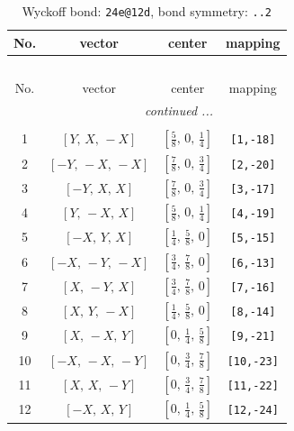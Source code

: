 \documentclass[fleqn,8pt]{jsarticle}
\begin{document}
\renewcommand{\arraystretch}{1.2}
\begin{longtable}{cccc}
\caption{Wyckoff bond: {\tt 24e@12d}, bond symmetry: {\tt ..2}}
 \\
 \hline \hline
No. & vector & center & mapping \\ \hline \endfirsthead

\multicolumn{3}{l}{\tablename\ \thetable{}} \\
 \hline \hline
No. & vector & center & mapping \\ \hline \endhead

 \hline \hline
\multicolumn{3}{r}{\footnotesize\it continued ...} \\ \endfoot

 \hline \hline
\multicolumn{3}{r}{} \\ \endlastfoot

1 & $\left[ Y,\, X,\, - X \right]$ & $\left[ \frac{5}{8},\, 0,\, \frac{1}{4} \right]$ & {\tt [1,-18]} \\ \hline
2 & $\left[ - Y,\, - X,\, - X \right]$ & $\left[ \frac{7}{8},\, 0,\, \frac{3}{4} \right]$ & {\tt [2,-20]} \\ \hline
3 & $\left[ - Y,\, X,\, X \right]$ & $\left[ \frac{7}{8},\, 0,\, \frac{3}{4} \right]$ & {\tt [3,-17]} \\ \hline
4 & $\left[ Y,\, - X,\, X \right]$ & $\left[ \frac{5}{8},\, 0,\, \frac{1}{4} \right]$ & {\tt [4,-19]} \\ \hline
5 & $\left[ - X,\, Y,\, X \right]$ & $\left[ \frac{1}{4},\, \frac{5}{8},\, 0 \right]$ & {\tt [5,-15]} \\ \hline
6 & $\left[ - X,\, - Y,\, - X \right]$ & $\left[ \frac{3}{4},\, \frac{7}{8},\, 0 \right]$ & {\tt [6,-13]} \\ \hline
7 & $\left[ X,\, - Y,\, X \right]$ & $\left[ \frac{3}{4},\, \frac{7}{8},\, 0 \right]$ & {\tt [7,-16]} \\ \hline
8 & $\left[ X,\, Y,\, - X \right]$ & $\left[ \frac{1}{4},\, \frac{5}{8},\, 0 \right]$ & {\tt [8,-14]} \\ \hline
9 & $\left[ X,\, - X,\, Y \right]$ & $\left[ 0,\, \frac{1}{4},\, \frac{5}{8} \right]$ & {\tt [9,-21]} \\ \hline
10 & $\left[ - X,\, - X,\, - Y \right]$ & $\left[ 0,\, \frac{3}{4},\, \frac{7}{8} \right]$ & {\tt [10,-23]} \\ \hline
11 & $\left[ X,\, X,\, - Y \right]$ & $\left[ 0,\, \frac{3}{4},\, \frac{7}{8} \right]$ & {\tt [11,-22]} \\ \hline
12 & $\left[ - X,\, X,\, Y \right]$ & $\left[ 0,\, \frac{1}{4},\, \frac{5}{8} \right]$ & {\tt [12,-24]} \\
\end{longtable}
\end{document}
